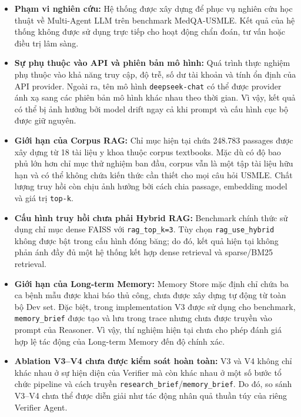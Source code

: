 \begin{itemize}
    \item \textbf{Phạm vi nghiên cứu:}
    Hệ thống được xây dựng để phục vụ nghiên cứu học thuật về
    Multi-Agent LLM trên benchmark MedQA-USMLE. Kết quả của hệ thống
    không được sử dụng trực tiếp cho hoạt động chẩn đoán, tư vấn hoặc
    điều trị lâm sàng.

    \item \textbf{Sự phụ thuộc vào API và phiên bản mô hình:}
    Quá trình thực nghiệm phụ thuộc vào khả năng truy cập, độ trễ,
    số dư tài khoản và tính ổn định của API provider. Ngoài ra, tên
    mô hình \texttt{deepseek-chat} có thể được provider ánh xạ sang
    các phiên bản mô hình khác nhau theo thời gian. Vì vậy, kết quả
    có thể bị ảnh hưởng bởi model drift ngay cả khi prompt và cấu
    hình cục bộ được giữ nguyên.

    \item \textbf{Giới hạn của Corpus RAG:}
    Chỉ mục hiện tại chứa 248.783 passages được xây dựng từ 18 tài
    liệu y khoa thuộc corpus textbooks. Mặc dù có độ bao phủ lớn hơn
    chỉ mục thử nghiệm ban đầu, corpus vẫn là một tập tài liệu hữu
    hạn và có thể không chứa kiến thức cần thiết cho mọi câu hỏi
    USMLE. Chất lượng truy hồi còn chịu ảnh hưởng bởi cách chia
    passage, embedding model và giá trị \texttt{top-k}.

    \item \textbf{Cấu hình truy hồi chưa phải Hybrid RAG:}
    Benchmark chính thức sử dụng chỉ mục dense FAISS với
    \texttt{rag\_top\_k=3}. Tùy chọn
    \texttt{rag\_use\_hybrid} không được bật trong cấu hình đóng
    băng; do đó, kết quả hiện tại không phản ánh đầy đủ một hệ thống
    kết hợp dense retrieval và sparse/BM25 retrieval.

    \item \textbf{Giới hạn của Long-term Memory:}
    Memory Store mặc định chỉ chứa ba ca bệnh mẫu được khai báo thủ
    công, chưa được xây dựng tự động từ toàn bộ Dev set. Đặc biệt,
    trong implementation V3 được sử dụng cho benchmark,
    \texttt{memory\_brief} được tạo và lưu trong trace nhưng chưa
    được truyền vào prompt của Reasoner. Vì vậy, thí nghiệm hiện tại
    chưa cho phép đánh giá hợp lệ tác động của Long-term Memory đến
    độ chính xác.

    \item \textbf{Ablation V3--V4 chưa được kiểm soát hoàn toàn:}
    V3 và V4 không chỉ khác nhau ở sự hiện diện của Verifier mà còn
    khác nhau ở một số bước tổ chức pipeline và cách truyền
    \texttt{research\_brief}/\texttt{memory\_brief}. Do đó, so sánh
    V3--V4 chưa thể được diễn giải như tác động nhân quả thuần túy
    của riêng Verifier Agent.


\end{itemize}
